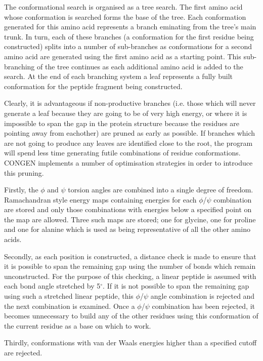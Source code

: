 \documentclass{report}
\newcommand{\degree}{\mbox{${}^{\circ}$}}
\begin{document}
The conformational search is organised as a tree search. 
The first amino acid whose conformation is searched forms the base of the
tree. Each conformation generated for this amino acid represents a branch
eminating from the tree's main trunk. In turn, each of these branches
(a conformation for the first residue being constructed) splits into a
number of sub-branches as conformations for a second amino acid are
generated using the first amino acid as a starting point. This
sub-branching of the tree continues as each additional amino acid
is added to the search. At the end of each branching system a leaf
represents a fully built conformation for the peptide fragment 
being constructed.

Clearly, it is advantageous if non-productive branches (i.e. those
which will never generate a leaf because they are going to be of very 
high energy, or where it is impossible
to span the gap in the protein structure because the residues are
pointing away from eachother) are pruned as early as possible. 
If branches which are not going to produce any leaves are identified close to 
the root, the program will spend less time generating futile combinations
of residue conformations.
CONGEN implements a number of optimisation strategies in order to
introduce this pruning.

Firstly, the $\phi$ and $\psi$ torsion angles are combined into a
single degree of freedom. Ramachandran style energy maps containing
energies for each $\phi$/$\psi$ combination are stored and only those
combinations with energies below a specified point on the map are allowed.
Three such maps are stored; one for glycine, one for proline and one for
alanine which is used as being representative of all the other amino
acids.

Secondly, as each position is constructed, a distance check is made to
ensure that it is possible to span the remaining gap using the number
of bonds which remain unconstructed. For the purpose of this checking,
a linear peptide is assumed with each bond angle stretched by 5\degree.
If it is not possible to span
the remaining gap using such a stretched linear peptide, this 
$\phi$/$\psi$ angle combination is rejected and the next combination
is examined. Once a $\phi$/$\psi$
combination has been rejected, it becomes unnecessary to build any
of the other residues using this conformation of the current residue
as a base on which to work.

Thirdly, conformations with van der Waals energies higher than a 
specified cutoff are rejected.
\end{document}
